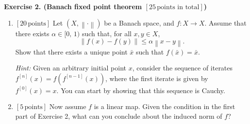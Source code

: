 \documentclass[fleqn,12pt, a4paper]{article}
\theoremstyle{definition}
\numberwithin{equation}{section}
\begin{document}
\bigskip
\clearpage
{\bf Exercise 2. (Banach fixed point theorem  {\bf$[25\, \text{points in total}]$})}
\begin{enumerate}
\item {\bf$[20\, \text{points}]$} Let $\left(X, \left\lVert\cdot\right\rVert\right)$ be a Banach space, and $f:X\rightarrow X$. Assume that there exists $\alpha\in[0,\, 1)$ such that, for all $x,y\in X$,
\begin{displaymath}
\left\lVert f(x) - f(y) \right\rVert
\leq
\alpha
\left\lVert x - y \right\rVert.
\end{displaymath}
Show that there exists a unique point $\bar{x}$ such that $f(\bar{x}) = \bar{x}$.

\noindent
{\em Hint:} 
Given an arbitrary initial point $x$,
consider the sequence of iterates 
$f^{[n]}(x) = f(f^{[n-1]}(x))$, where the first iterate is given by $f^{[0]}(x)=x$. You can start by showing that this sequence is Cauchy.

\item {\bf$[5\, \text{points}]$} Now assume $f$ is a linear map. Given the condition in the first part of Exercise 2, what can you conclude about the induced norm of $f$?

\end{enumerate}

\bigskip
\end{document}
